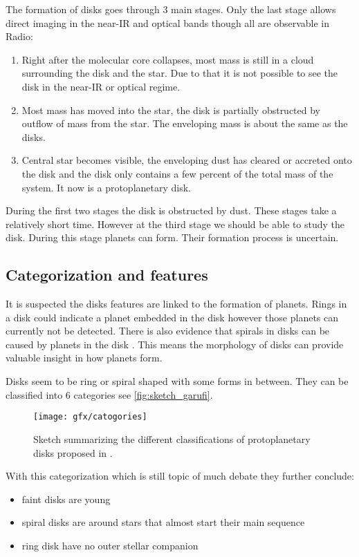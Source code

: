 The formation of disks goes through 3 main stages\cite{williams}. Only the last stage allows direct imaging in the near-IR and optical bands though all are observable in Radio:

\begin{enumerate}
  \item Right after the molecular core collapses, most mass is still in a cloud surrounding the disk and the star. Due to that it is not possible to see the disk in the near-IR  or optical regime.
  \item Most mass has moved into the star, the disk is partially obstructed by outflow of mass from the star. The enveloping mass is about the same as the disks.
  \item Central star becomes visible, the enveloping dust has cleared or accreted onto the disk and the disk only contains a few percent of the total mass of the system. It now is a protoplanetary disk.
\end{enumerate}

During the first two stages the disk is obstructed by dust. These stages take a relatively short time. However at the third stage we should be able to study the disk. During this stage planets can form. Their formation process is uncertain. 

\subsection{Categorization and features}

It is suspected the disks features are linked to the formation of planets. Rings in a disk could indicate a planet embedded in the disk \cite{rings} however those planets can currently not be detected. There is also evidence that spirals in disks can be caused by planets in the disk \cite{garufi}. This means the morphology of disks can provide valuable insight in how planets form.

Disks seem to be ring or spiral shaped with some forms in between. They can be classified into 6 categories \cite{garufi} see \autoref{fig:sketch_garufi}. 

\begin{figure}[H]
    \caption{Sketch summarizing the different classifications of protoplanetary disks proposed in \cite{garufi}.}
    \centering
    \texttt{[image: gfx/catogories]}
    \label{fig:sketch_garufi}
\end{figure}

With this categorization which is still topic of much debate they \cite{garufi} further conclude:
\begin{itemize}
    \item faint disks are young
    \item spiral disks are around stars that almost start their main sequence
    \item ring disk have no outer stellar companion %
\end{itemize}

